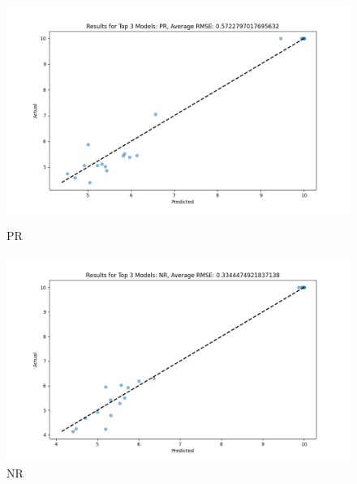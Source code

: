\begin{figure}[H]
    \centering
    \begin{minipage}{0.495\textwidth}
        \centering
        \includegraphics[width=\linewidth]{reg_section_specxtra/images_reg_ensemble/ensemble_learning_rmse_plot_top_3_Models_PR.png}
        \caption{PR}
        \label{fig:pr_ensemble}
    \end{minipage}\hfill
    \begin{minipage}{0.495\textwidth}
        \centering
        \includegraphics[width=\linewidth]{reg_section_specxtra/images_reg_ensemble/ensemble_learning_rmse_plot_top_3_Models_NR.png}
        \caption{NR}
        \label{fig:nr_ensemble}
    \end{minipage}
\end{figure}

